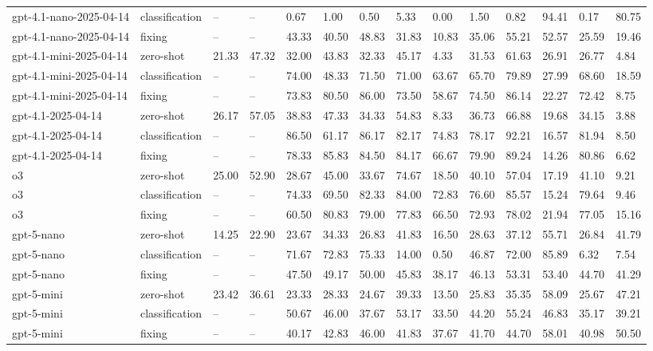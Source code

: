 \begin{table}[!t]
\begin{tabular}{llllllllllllll}
gpt-4.1-nano-2025-04-14 & classification & -- & -- & 0.67 & 1.00 & 0.50 & 5.33 & 0.00 & 1.50 & 0.82 & 94.41 & 0.17 & 80.75 \\
gpt-4.1-nano-2025-04-14 & fixing & -- & -- & 43.33 & 40.50 & 48.83 & 31.83 & 10.83 & 35.06 & 55.21 & 52.57 & 25.59 & 19.46 \\
gpt-4.1-mini-2025-04-14 & zero-shot & 21.33 & 47.32 & 32.00 & 43.83 & 32.33 & 45.17 & 4.33 & 31.53 & 61.63 & 26.91 & 26.77 & 4.84 \\
gpt-4.1-mini-2025-04-14 & classification & -- & -- & 74.00 & 48.33 & 71.50 & 71.00 & 63.67 & 65.70 & 79.89 & 27.99 & 68.60 & 18.59 \\
gpt-4.1-mini-2025-04-14 & fixing & -- & -- & 73.83 & 80.50 & 86.00 & 73.50 & 58.67 & 74.50 & 86.14 & 22.27 & 72.42 & 8.75 \\
gpt-4.1-2025-04-14 & zero-shot & 26.17 & 57.05 & 38.83 & 47.33 & 34.33 & 54.83 & 8.33 & 36.73 & 66.88 & 19.68 & 34.15 & 3.88 \\
gpt-4.1-2025-04-14 & classification & -- & -- & 86.50 & 61.17 & 86.17 & 82.17 & 74.83 & 78.17 & 92.21 & 16.57 & 81.94 & 8.50 \\
gpt-4.1-2025-04-14 & fixing & -- & -- & 78.33 & 85.83 & 84.50 & 84.17 & 66.67 & 79.90 & 89.24 & 14.26 & 80.86 & 6.62 \\
o3 & zero-shot & 25.00 & 52.90 & 28.67 & 45.00 & 33.67 & 74.67 & 18.50 & 40.10 & 57.04 & 17.19 & 41.10 & 9.21 \\
o3 & classification & -- & -- & 74.33 & 69.50 & 82.33 & 84.00 & 72.83 & 76.60 & 85.57 & 15.24 & 79.64 & 9.46 \\
o3 & fixing & -- & -- & 60.50 & 80.83 & 79.00 & 77.83 & 66.50 & 72.93 & 78.02 & 21.94 & 77.05 & 15.16 \\
gpt-5-nano & zero-shot & 14.25 & 22.90 & 23.67 & 34.33 & 26.83 & 41.83 & 16.50 & 28.63 & 37.12 & 55.71 & 26.84 & 41.79 \\
gpt-5-nano & classification & -- & -- & 71.67 & 72.83 & 75.33 & 14.00 & 0.50 & 46.87 & 72.00 & 85.89 & 6.32 & 7.54 \\
gpt-5-nano & fixing & -- & -- & 47.50 & 49.17 & 50.00 & 45.83 & 38.17 & 46.13 & 53.31 & 53.40 & 44.70 & 41.29 \\
gpt-5-mini & zero-shot & 23.42 & 36.61 & 23.33 & 28.33 & 24.67 & 39.33 & 13.50 & 25.83 & 35.35 & 58.09 & 25.67 & 47.21 \\
gpt-5-mini & classification & -- & -- & 50.67 & 46.00 & 37.67 & 53.17 & 33.50 & 44.20 & 55.24 & 46.83 & 35.17 & 39.21 \\
gpt-5-mini & fixing & -- & -- & 40.17 & 42.83 & 46.00 & 41.83 & 37.67 & 41.70 & 44.70 & 58.01 & 40.98 & 50.50 \\

\end{tabular}
\end{table}

